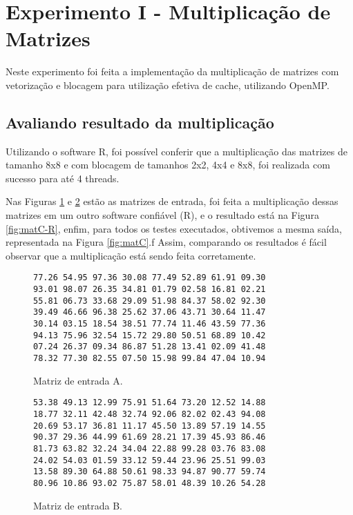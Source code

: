 \documentclass[conference]{IEEEtran}
\begin{document}
\section{Experimento I - Multiplicação de Matrizes}


Neste experimento foi feita a implementação da multiplicação de matrizes com vetorização e blocagem para utilização efetiva de cache, utilizando OpenMP. 

\subsection{Avaliando resultado da multiplicação}
Utilizando o software R, foi possível conferir que a multiplicação das matrizes de tamanho 8x8 e com blocagem de tamanhos 2x2, 4x4 e 8x8, foi realizada com sucesso para até 4 threads.

Nas Figuras \ref{fig:matA} e \ref{fig:matB} estão as matrizes de entrada, foi feita a multiplicação dessas matrizes em um outro software confiável (R), e o resultado está na Figura \ref{fig:matC-R}, enfim, para todos os testes executados, obtivemos a mesma saída, representada na Figura \ref{fig:matC}.f Assim, comparando os resultados é fácil observar que a multiplicação está sendo feita corretamente.

\begin{figure}[htb!]
\begin{adjustbox}{max width=\linewidth}
	\begin{BVerbatim}
77.26 54.95 97.36 30.08 77.49 52.89 61.91 09.30 
93.01 98.07 26.35 34.81 01.79 02.58 16.81 02.21 
55.81 06.73 33.68 29.09 51.98 84.37 58.02 92.30 
39.49 46.66 96.38 25.62 37.06 43.71 30.64 11.47 
30.14 03.15 18.54 38.51 77.74 11.46 43.59 77.36 
94.13 75.96 32.54 15.72 29.80 50.51 68.89 10.42 
07.24 26.37 09.34 86.87 51.28 13.41 02.09 41.48 
78.32 77.30 82.55 07.50 15.98 99.84 47.04 10.94 
	\end{BVerbatim}
\end{adjustbox}
\caption{Matriz de entrada A.\label{fig:matA}}
\end{figure}


\begin{figure}[htb!]
	\begin{adjustbox}{max width=\linewidth}
		\begin{BVerbatim}
53.38 49.13 12.99 75.91 51.64 73.20 12.52 14.88 
18.77 32.11 42.48 32.74 92.06 82.02 02.43 94.08 
20.69 53.17 36.81 11.17 45.50 13.89 57.19 14.55 
90.37 29.36 44.99 61.69 28.21 17.39 45.93 86.46 
81.73 63.82 32.24 34.04 22.88 99.28 03.76 83.08 
24.02 54.03 01.59 33.12 59.44 23.96 25.51 99.03 
13.58 89.30 64.88 50.61 98.33 94.87 90.77 59.74 
80.96 10.86 93.02 75.87 58.01 48.39 10.26 54.28 
		\end{BVerbatim}
	\end{adjustbox}
	\caption{Matriz de entrada B.\label{fig:matB}}
\end{figure}
\end{document}

